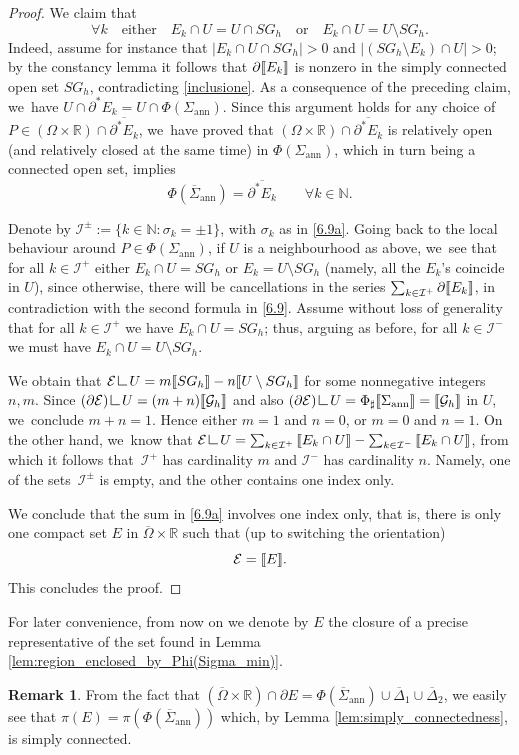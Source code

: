 \documentclass[JEP,XML,SOM,Unicode, NoFloatCountersInSection,published]{cedram}
\newcommand{\R}{\mathbb{R}}
\newcommand{\jump}[1]{\textup{\textlbrackdbl}{#1}\textup{\textrbrackdbl}}
\newcommand{\openannulus}{\Sigma_\mathrm{ann}}
\newcommand{\immclosedann}{\Phi({\overline\Sigma}_\mathrm{ann})}
\newcommand{\resa}{\mathop{\hbox{\vrule height 7pt width 0.5pt depth 0pt
\vrule height 0.5pt width 6pt depth 0pt}}\nolimits}
\newcommand{\resb}{\mathop{\hbox{\vrule height 4pt width 0.5pt depth 0pt
\vrule height 0.5pt width 3pt depth 0pt}}\nolimits}
\newcommand{\res}{\mathchoice{\resa}{\resa}{\resb}{\resb}}
\theoremstyle{definition}
\newtheorem{remark}[theorem]{Remark}
\begin{document}
\begin{proof}
We claim that
\[
\forall k\quad\text{either}\quad E_k\cap U=U \cap SG_h
\quad\text{or} \quad E_k\cap U=U\setminus SG_h.
\]
Indeed, assume for instance that $|E_k\cap U \cap
SG_h|>0$ and $|(SG_h\setminus E_k)\cap U|>0$; by the constancy lemma \cite{Krantz-Parks} it follows that $\partial\jump{E_k}$ is nonzero in the simply connected open set $SG_h$, contradicting \eqref{inclusione}.
As a consequence of the preceding claim, we~have $U\cap \partial^*E_k=U\cap \Phi(\openannulus)$. Since this argument holds for any choice of $P\in (\Omega\times\R)\cap \overline{\partial^*E_k}$, we~have proved that $(\Omega\times\R)\cap \overline{\partial^*E_k}$ is relatively open
(and relatively closed at the same time) in $\Phi(\openannulus)$, which in turn being a connected open set, implies
\[
\immclosedann=\overline{\partial^*E_k}\qquad \forall k\in \mathbb N.
\]

Denote by $\mathcal I^{\pm}:=\{k\in \mathbb N:\sigma_k=\pm1\}$, with
$\sigma_k$ as in \eqref{6.9a}.
Going back to the local behaviour around $P\in \Phi(\openannulus)$, if $U$ is a neighbourhood as above, we~see that for all $k\in \mathcal I^+$ either $E_k\cap U=SG_h$ or $E_k=U\setminus SG_h$ (namely, all the $E_k$'s coincide in $U$), since otherwise, there will be cancellations in the series $\sum_{k\in \mathcal I^+}\partial \jump{E_k}$, in contradiction with the second formula in \eqref{6.9}. Assume without loss of generality that for all $k\in \mathcal I^+$ we have $E_k\cap U=SG_h$; thus, arguing as before, for all $k\in \mathcal I^-$ we must have $E_k\cap U=U\setminus SG_h$.

We obtain that $\mathcal E\res U=m\jump{SG_h}-n\jump{U\setminus SG_h}$
for some nonnegative integers $n,m$. Since $(\partial \mathcal E)\res U=(m+n)\jump{\mathcal G_h}$
and also $(\partial\mathcal E)\res U=\Phi_\sharp\jump{\openannulus}=\jump{\mathcal G_h}$ in $U$, we~conclude $m+n=1$. Hence either $m=1$
and $n=0$, or $m=0$ and $n=1$. On the other hand, we~know that
$\mathcal E\res U=\sum_{k\in \mathcal I^+}\jump{E_k\cap U}-\sum_{k\in \mathcal I^-}\jump{E_k\cap U}$, from which it follows that~$\mathcal I^+$ has cardinality $m$ and $\mathcal I^-$ has cardinality $n$.
Namely, one of the sets~$\mathcal I^\pm$ is empty, and the other contains
one index only.

We conclude that the sum in \eqref{6.9a} involves one index only, that is, there is only one compact set $E$ in $\overline\Omega\times\R$ such that (up to switching the orientation)
\[
\mathcal E=\jump{E}.
\]
This concludes the proof.
\end{proof}
For later convenience, from now on we denote by $E$ the closure of a
precise representative of the set found in Lemma
\ref{lem:region_enclosed_by_Phi(Sigma_min)}.
\begin{remark}\label{rem:steiner-sym}
From the fact that $ (\overline \Omega\times\R)\cap \partial E=\immclosedann\cup\overline\Delta_1\cup\overline\Delta_2$, we
easily see that $\pi( E)=\pi(\immclosedann)$ which, by Lemma \ref{lem:simply_connectedness}, is simply connected.
\end{remark}
\end{document}
